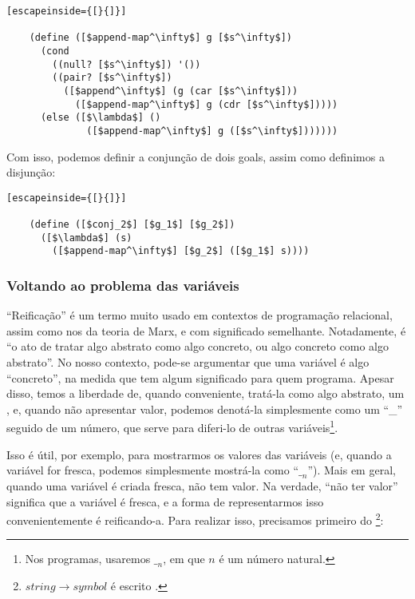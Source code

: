   \begin{lstlisting}[escapeinside={[}{]}]

    (define ([$append-map^\infty$] g [$s^\infty$])
      (cond
        ((null? [$s^\infty$]) '())
        ((pair? [$s^\infty$])
          ([$append^\infty$] (g (car [$s^\infty$]))
            ([$append-map^\infty$] g (cdr [$s^\infty$]))))
      (else ([$\lambda$] ()
              ([$append-map^\infty$] g ([$s^\infty$]))))))

  \end{lstlisting}

  Com isso, podemos definir a conjunção de dois goals, assim como
  definimos a disjunção:

  \begin{lstlisting}[escapeinside={[}{]}]

    (define ([$conj_2$] [$g_1$] [$g_2$])
      ([$\lambda$] (s)
        ([$append-map^\infty$] [$g_2$] ([$g_1$] s))))

  \end{lstlisting}

  
  \subsubsection{Voltando ao problema das variáveis}


  ``Reificação'' é um termo muito usado em contextos de programação
  relacional, assim como nos da teoria de Marx, e com significado
  semelhante. Notadamente, é ``o ato de tratar algo abstrato como algo
  concreto, ou algo concreto como algo abstrato''. No nosso contexto,
  pode-se argumentar que uma variável é algo ``concreto'', na medida
  que tem algum significado para quem programa. Apesar disso, temos a
  liberdade de, quando conveniente, tratá-la como algo abstrato, um
  , e, quando não apresentar valor, podemos
  denotá-la simplesmente como um ``\_'' seguido de um número, que
  serve para diferi-lo de outras variáveis\footnote{Nos programas,
    usaremos $\__n$, em que $n$ é um número natural.}.

  Isso é útil, por exemplo, para mostrarmos os valores das variáveis
  (e, quando a variável for fresca, podemos simplesmente mostrá-la
  como ``$\__n$''). Mais em geral, quando uma variável é criada
  fresca, não tem valor. Na verdade, ``não ter valor'' significa que a
  variável é fresca, e a forma de representarmos isso convenientemente
  é reificando-a. Para realizar isso, precisamos primeiro do
  \footnote{$string\rightarrow symbol$ é escrito
    .}:


